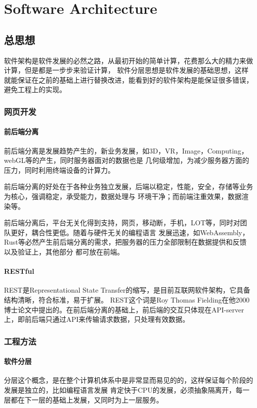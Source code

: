 \clearpage
\part{Software Architecture}

\chapter{总思想}
软件架构是软件发展的必然之路，从最初开始的简单计算，花费那么大的精力来做计算，但是都是一步步来验证计算，
软件分层思想是软件发展的基础思想，这样就能保证在之前的基础上进行替换改进，能看到好的软件架构是能保证很多错误，
避免工程上的实现。


\section{网页开发}

\subsection{前后端分离}
前后端分离是发展趋势产生的，新业务发展，如3D，VR，Image，Computing，webGL等的产生，同时服务器面对的数据也是
几何级增加，为减少服务器方面的压力，同时利用终端设备的计算力。

前后端分离的好处在于各种业务独立发展，后端以稳定，性能，安全，存储等业务为核心，强调稳定，承受能力，数据处理与
环境干净；而前端注重效果，数据渲染等。

前后端分离后，平台无关化得到支持，网页，移动断，手机，LOT等，同时对团队更好，耦合性更低。随着与硬件无关的编程语言
发展迅速，如WebAssembly，Rust等必然产生前后端分离的需求，把服务器的压力全部限制在数据提供和反馈以及验证上，其他部分
都可放在前端。

\subsection{RESTful}
REST是Representational State Transfer的缩写，是目前互联网软件架构，它具备结构清晰，符合标准，易于扩展。
REST这个词是Roy Thomas Fielding在他2000博士论文中提出的。在前后端分离的基础上，前后端的交互只体现在API-server
上，即前后端只通过API来传输请求数据，只处理有效数据。


\section{工程方法}

\subsection{软件分层}
分层这个概念，是在整个计算机体系中是非常显而易见的的，这样保证每个阶段的发展是独立的，比如编程语言发展
肯定快于CPU的发展，必须抽象隔离开，每一层都在下一层的基础上发展，又同时为上一层服务。

